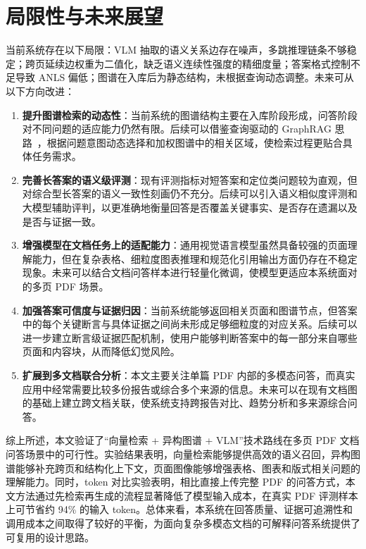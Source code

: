 \section{局限性与未来展望}\label{sec:limitations}

当前系统存在以下局限：VLM 抽取的语义关系边存在噪声，多跳推理链条不够稳定；跨页延续边权重为二值化，缺乏语义连续性强度的精细度量；答案格式控制不足导致 ANLS 偏低；图谱在入库后为静态结构，未根据查询动态调整。未来可从以下方向改进：

\begin{enumerate}[label=（\arabic*）]
\item \textbf{提升图谱检索的动态性}：当前系统的图谱结构主要在入库阶段形成，问答阶段对不同问题的适应能力仍然有限。后续可以借鉴查询驱动的 GraphRAG 思路~\cite{bu2025query}，根据问题意图动态选择和加权图谱中的相关区域，使检索过程更贴合具体任务需求。
\item \textbf{完善长答案的语义级评测}：现有评测指标对短答案和定位类问题较为直观，但对综合型长答案的语义一致性刻画仍不充分。后续可以引入语义相似度评测和大模型辅助评判，以更准确地衡量回答是否覆盖关键事实、是否存在遗漏以及是否与证据一致。
\item \textbf{增强模型在文档任务上的适配能力}：通用视觉语言模型虽然具备较强的页面理解能力，但在复杂表格、细粒度图表推理和规范化引用输出方面仍存在不稳定现象。未来可以结合文档问答样本进行轻量化微调，使模型更适应本系统面对的多页 PDF 场景。
\item \textbf{加强答案可信度与证据归因}：当前系统能够返回相关页面和图谱节点，但答案中的每个关键断言与具体证据之间尚未形成足够细粒度的对应关系。后续可以进一步建立断言级证据匹配机制，使用户能够判断答案中的每一部分来自哪些页面和内容块，从而降低幻觉风险。
\item \textbf{扩展到多文档联合分析}：本文主要关注单篇 PDF 内部的多模态问答，而真实应用中经常需要比较多份报告或综合多个来源的信息。未来可以在现有文档图的基础上建立跨文档关联，使系统支持跨报告对比、趋势分析和多来源综合问答。
\end{enumerate}

综上所述，本文验证了``向量检索 + 异构图谱 + VLM''技术路线在多页 PDF 文档问答场景中的可行性。实验结果表明，向量检索能够提供高效的语义召回，异构图谱能够补充跨页和结构化上下文，页面图像能够增强表格、图表和版式相关问题的理解能力。同时，token 对比实验表明，相比直接上传完整 PDF 的问答方式，本文方法通过先检索再生成的流程显著降低了模型输入成本，在真实 PDF 评测样本上可节省约 94\% 的输入 token。总体来看，本系统在回答质量、证据可追溯性和调用成本之间取得了较好的平衡，为面向复杂多模态文档的可解释问答系统提供了可复用的设计思路。
